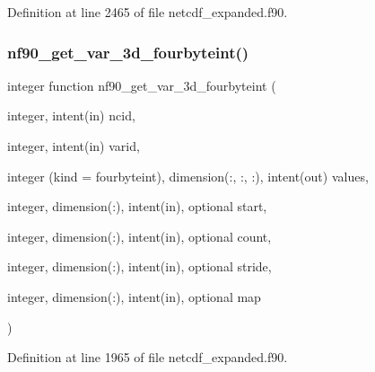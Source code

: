 Definition at line 2465 of file netcdf\+\_\+expanded.\+f90.

\mbox{\label{netcdf__expanded_8f90_a1dbb8f5ccd9b6597d6d9572f39548083}} 
\subsubsection{\texorpdfstring{nf90\+\_\+get\+\_\+var\+\_\+3d\+\_\+fourbyteint()}{nf90\_get\_var\_3d\_fourbyteint()}}
{\footnotesize\ttfamily integer function nf90\+\_\+get\+\_\+var\+\_\+3d\+\_\+fourbyteint (\begin{DoxyParamCaption}\item[{integer, intent(in)}]{ncid,  }\item[{integer, intent(in)}]{varid,  }\item[{integer (kind = fourbyteint), dimension(\+:, \+:, \+:), intent(out)}]{values,  }\item[{integer, dimension(\+:), intent(in), optional}]{start,  }\item[{integer, dimension(\+:), intent(in), optional}]{count,  }\item[{integer, dimension(\+:), intent(in), optional}]{stride,  }\item[{integer, dimension(\+:), intent(in), optional}]{map }\end{DoxyParamCaption})}



Definition at line 1965 of file netcdf\+\_\+expanded.\+f90.

\mbox{\label{netcdf__expanded_8f90_af04e63804907cd0cff2db5672e7981ea}} 
